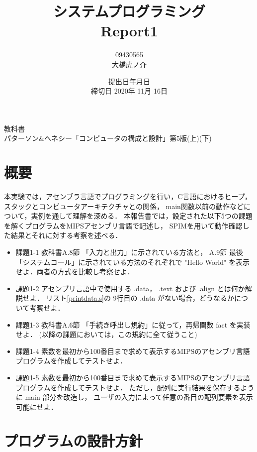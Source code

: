 \documentclass[11pt]{jarticle}
\begin{document}
\title{システムプログラミング\\Report1}
\author{09430565\\大橋虎ノ介}
\date{提出日\number\year 年\number\month 月\number\day 日\\
締切日 2020年 11月 16日}

\maketitle
\begin{center}
教科書\\
 パターソン\&ヘネシー「コンピュータの構成と設計」第5版(上)(下)
\end{center}
\newpage

\section{概要}

本実験では，アセンブラ言語でプログラミングを行い，C言語におけるヒープ，
スタックとコンピュータアーキテクチャとの関係， main関数以前の動作などについて，実例を通して理解を深める．
本報告書では，設定された以下5つの課題を解くプログラムをMIPSアセンブリ言語で記述し，
SPIMを用いて動作確認した結果とそれに対する考察を述べる．

\begin{itemize}
  \item 課題1-1 教科書A.8節 「入力と出力」に示されている方法と， A.9節 最後「システムコール」に示されている方法のそれぞれで "Hello World" を表示せよ．両者の方式を比較し考察せよ．
  \item 課題1-2 アセンブリ言語中で使用する .data， .text および .align とは何か解説せよ． リスト\ref{printdata.s}の 9行目の .data がない場合，どうなるかについて考察せよ．
  \item 課題1-3 教科書A.6節 「手続き呼出し規約」に従って，再帰関数 fact を実装せよ． (以降の課題においては，この規約に全て従うこと)
  \item 課題1-4 素数を最初から100番目まで求めて表示するMIPSのアセンブリ言語プログラムを作成してテストせよ．
  \item 課題1-5 素数を最初から100番目まで求めて表示するMIPSのアセンブリ言語プログラムを作成してテストせよ． ただし，配列に実行結果を保存するように main 部分を改造し， ユーザの入力によって任意の番目の配列要素を表示可能にせよ．
\end{itemize}

\section{プログラムの設計方針}
\end{document}
